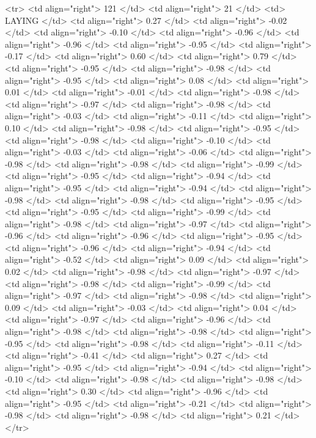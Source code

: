   <tr> <td align="right"> 121 </td> <td align="right">  21 </td> <td> LAYING </td> <td align="right"> 0.27 </td> <td align="right"> -0.02 </td> <td align="right"> -0.10 </td> <td align="right"> -0.96 </td> <td align="right"> -0.96 </td> <td align="right"> -0.95 </td> <td align="right"> -0.17 </td> <td align="right"> 0.60 </td> <td align="right"> 0.79 </td> <td align="right"> -0.95 </td> <td align="right"> -0.98 </td> <td align="right"> -0.95 </td> <td align="right"> 0.08 </td> <td align="right"> 0.01 </td> <td align="right"> -0.01 </td> <td align="right"> -0.98 </td> <td align="right"> -0.97 </td> <td align="right"> -0.98 </td> <td align="right"> -0.03 </td> <td align="right"> -0.11 </td> <td align="right"> 0.10 </td> <td align="right"> -0.98 </td> <td align="right"> -0.95 </td> <td align="right"> -0.98 </td> <td align="right"> -0.10 </td> <td align="right"> -0.03 </td> <td align="right"> -0.06 </td> <td align="right"> -0.98 </td> <td align="right"> -0.98 </td> <td align="right"> -0.99 </td> <td align="right"> -0.95 </td> <td align="right"> -0.94 </td> <td align="right"> -0.95 </td> <td align="right"> -0.94 </td> <td align="right"> -0.98 </td> <td align="right"> -0.98 </td> <td align="right"> -0.95 </td> <td align="right"> -0.95 </td> <td align="right"> -0.99 </td> <td align="right"> -0.98 </td> <td align="right"> -0.97 </td> <td align="right"> -0.96 </td> <td align="right"> -0.96 </td> <td align="right"> -0.95 </td> <td align="right"> -0.96 </td> <td align="right"> -0.94 </td> <td align="right"> -0.52 </td> <td align="right"> 0.09 </td> <td align="right"> 0.02 </td> <td align="right"> -0.98 </td> <td align="right"> -0.97 </td> <td align="right"> -0.98 </td> <td align="right"> -0.99 </td> <td align="right"> -0.97 </td> <td align="right"> -0.98 </td> <td align="right"> 0.09 </td> <td align="right"> -0.03 </td> <td align="right"> 0.04 </td> <td align="right"> -0.97 </td> <td align="right"> -0.96 </td> <td align="right"> -0.98 </td> <td align="right"> -0.98 </td> <td align="right"> -0.95 </td> <td align="right"> -0.98 </td> <td align="right"> -0.11 </td> <td align="right"> -0.41 </td> <td align="right"> 0.27 </td> <td align="right"> -0.95 </td> <td align="right"> -0.94 </td> <td align="right"> -0.10 </td> <td align="right"> -0.98 </td> <td align="right"> -0.98 </td> <td align="right"> 0.30 </td> <td align="right"> -0.96 </td> <td align="right"> -0.95 </td> <td align="right"> -0.21 </td> <td align="right"> -0.98 </td> <td align="right"> -0.98 </td> <td align="right"> 0.21 </td> </tr>
